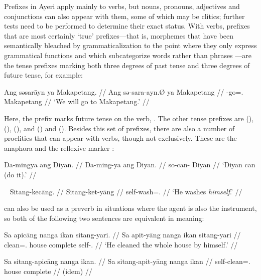 Prefixes in Ayeri apply mainly to verbs, but nouns, pronouns, adjectives and 
conjunctions can also appear with them, some of which may be clitics; further 
tests need to be performed to determine their exact status.
With verbs, prefixes that are most certainly `true' prefixes---that is, 
morphemes that have been semantically bleached by grammaticalization to the 
point where they only express grammatical functions \citep[157ff.]{lehmann2015} 
and which subcategorize words rather than phrases 
\citep[117]{klavans1985}---are the tense prefixes marking both three degrees of 
past tense and three degrees of future tense, for example:

\ex\begingl
	\gla Ang səsarāyn ya Makapetang. //
	\glb Ang sə-sara-ayn.Ø ya Makapetang //
	\glc \AgtT{} \Fut{}-go=\Fpl{}.\Top{} \Loc{} Makapetang //
	\glft `We will go to Makapetang.' //
\endgl\xe

Here, the prefix  marks future tense on the verb, 
. The other tense prefixes are  
(\NPst{}),  (\Pst{}),  (\RPst{}), and 
 (\NFut{}) and  (\RFut{}). Besides this set of 
prefixes, there are also a number of proclitics that can appear with verbs, 
though not exclusively. These are the anaphora  
and the reflexive marker :
 
\ex\begingl
	\gla Da-mingya ang Diyan. //
	\glb Da-ming-ya ang Diyan. //
	\glc so-can-\TsgM{} \Aarg{} Diyan //
	\glft `Diyan can (do it).' //
\endgl
% 
\xe

\ex~\begingl
	\gla Sitang-kecāng. //
	\glb Sitang-ket-yāng //
	\glc self-wash=\TsgM{}.\Aarg{} //
	\glft `He washes \emph{himself}.' //
\endgl\xe

 can also be used as a preverb in situations where the 
agent is also the instrument, so both of the following two sentences are 
equivalent in meaning:

\pex
\a\label{ex:sitang+pronoun}\begingl
	\gla Sa apicāng nanga ikan sitang-yari. //
	\glb Sa apit-yāng nanga ikan sitang-yari //
	\glc \PatT{} clean=\Tsg{}.\Aarg{} house complete self-\TsgM{}.\Ins{} //
	\glft `He cleaned the whole house by himself.' //
\endgl

\a\begingl
	\gla Sa sitang-apicāng nanga ikan. //
	\glb Sa sitang-apit-yāng nanga ikan //
	\glc \PatT{} self-clean=\Tsg{}.\Aarg{} house complete //
	\glft (idem) //
\endgl
\xe

